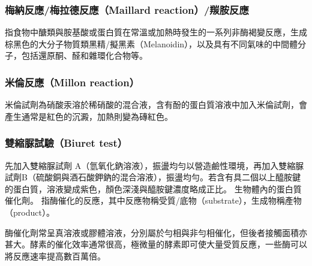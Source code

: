 \documentclass[a4paper,12pt]{report}
\begin{document}
\begin{itemize}
\begin{itemize}
\subsubsection{梅納反應/梅拉德反應（Maillard reaction）/羰胺反應}
指食物中醣類與胺基酸或蛋白質在常溫或加熱時發生的一系列非酶褐變反應，生成棕黑色的大分子物質類黑精/擬黑素（Melanoidin），以及具有不同氣味的中間體分子，包括還原酮、醛和雜環化合物等。
\subsubsection{米倫反應（Millon reaction）}
米倫試劑為硝酸汞溶於稀硝酸的混合液，含有酚的蛋白質溶液中加入米倫試劑，會產生通常是紅色的沉澱，加熱則變為磚紅色。
\subsubsection{雙縮脲試驗（Biuret test）}
先加入雙縮脲試劑 A（氫氧化鈉溶液），振盪均勻以營造鹼性環境，再加入雙縮脲試劑B（硫酸銅與酒石酸鉀鈉的混合溶液），振盪均勻。若含有具二個以上醯胺鍵的蛋白質，溶液變成紫色，顏色深淺與醯胺鍵濃度略成正比。
生物體內的蛋白質催化劑。
指酶催化的反應，其中反應物稱受質/底物（substrate），生成物稱產物（product）。

酶催化劑常呈真溶液或膠體溶液，分別屬於勻相與非勻相催化，但後者接觸面積亦甚大。酵素的催化效率通常很高，極微量的酵素即可使大量受質反應，一些酶可以將反應速率提高數百萬倍。


\end{itemize}
\end{itemize}
\end{document}
